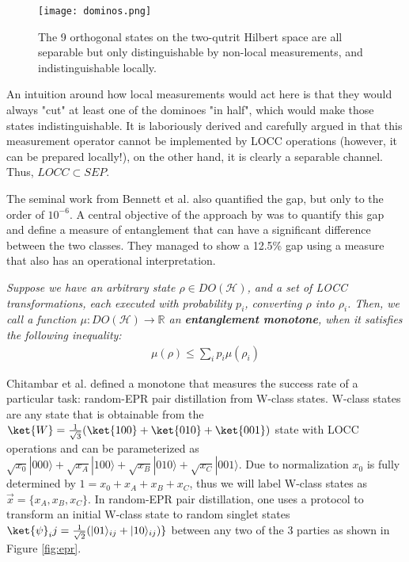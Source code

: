 \begin{figure}[!ht]
\center
\texttt{[image: dominos.png]}
\caption{The 9 orthogonal states on the two-qutrit Hilbert space are all separable but only distinguishable by non-local measurements, and  indistinguishable locally.}
\label{fig:dominos}
\end{figure}

An intuition around how local measurements would act here is that they would always "cut" at least one of the dominoes "in half", which would make those states indistinguishable. It is laboriously derived and carefully argued in  \cite{bennett_quantum_1999} that this measurement operator cannot be implemented by LOCC operations (however, it can be prepared locally!), on the other hand, it is clearly a separable channel. Thus, $LOCC \subset SEP$. 

The seminal work from Bennett et al. also quantified the gap, but only to the order of $10^{-6}$. A central objective of the approach by \cite{chitambar_increasing_2012} was to quantify this gap and define a measure of entanglement that can have a significant difference between the two classes. They managed to show a 12.5\% gap using a measure that also has an operational interpretation. 

\begin{definition} \textit{Suppose we have an arbitrary state $\rho \in DO(\mathcal{H})$, and a set of LOCC transformations, each executed with probability $p_i$, converting $\rho$ into $\rho_i$. Then, we call a function $\mu: DO(\mathcal{H}) \rightarrow \mathbb{R}$ an \textbf{entanglement monotone}, when it satisfies the following inequality: 
\begin{align}
\mu(\rho) \leq \sum_i p_i \mu(\rho_i)
\end{align}
}
\end{definition}

Chitambar et al. defined a monotone that measures the success rate of a particular task: random-EPR pair distillation from  W-class states. W-class states are any state that is obtainable from the $\ket{W}=\frac{1}{\sqrt{3}}(\ket{100}+\ket{010}+\ket{001})$ state with LOCC operations and can be parameterized as $\sqrt{x_0}|000\rangle + \sqrt{x_A}|100\rangle + \sqrt{x_B}|010\rangle + \sqrt{x_C}|001\rangle$. Due to normalization $x_0$ is fully determined by $1=x_0+x_A+x_B+x_C$, thus we will label W-class states as $\vec{x}=\{x_A,x_B,x_C\}$. In random-EPR pair distillation, one uses a protocol to transform an initial W-class state to random singlet states $\ket{\psi}_ij=\frac{1}{\sqrt{2}}(|01\rangle_{ij} + |10\rangle_{ij})\}$ between any two of the 3 parties as shown in Figure \ref{fig:epr}.

